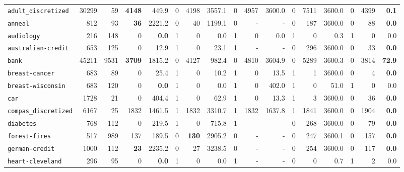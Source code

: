 \begin{tabular}{lccrrrrrrrrrrrrrr}
\texttt{adult\_discretized} & \multicolumn{1}{r}{30299} & \multicolumn{1}{r}{59}  & \textbf{4148} & 449.9 & 0 & 4198 & 3557.1 & 0 & 4957 & 3600.0 & 0 & 7511 & 3600.0 & 0 & 4399 & \textbf{0.1}\\
\texttt{anneal} & \multicolumn{1}{r}{812} & \multicolumn{1}{r}{93}  & \textbf{36} & 2221.2 & 0 & 40 & 1199.1 & 0 & - & - & 0 & 187 & 3600.0 & 0 & 88 & \textbf{0.0}\\
\texttt{audiology} & \multicolumn{1}{r}{216} & \multicolumn{1}{r}{148}  & 0 & \textbf{0.0} & 1 & 0 & 0.0 & 1 & 0 & 0.0 & 1 & 0 & 0.3 & 1 & 0 & 0.0\\
\texttt{australian-credit} & \multicolumn{1}{r}{653} & \multicolumn{1}{r}{125}  & 0 & 12.9 & 1 & 0 & 23.1 & 1 & - & - & 0 & 296 & 3600.0 & 0 & 33 & \textbf{0.0}\\
\texttt{bank} & \multicolumn{1}{r}{45211} & \multicolumn{1}{r}{9531}  & \textbf{3709} & 1815.2 & 0 & 4127 & 982.4 & 0 & 4810 & 3604.9 & 0 & 5289 & 3600.3 & 0 & 3814 & \textbf{72.9}\\
\texttt{breast-cancer} & \multicolumn{1}{r}{683} & \multicolumn{1}{r}{89}  & 0 & 25.4 & 1 & 0 & 10.2 & 1 & 0 & 13.5 & 1 & 1 & 3600.0 & 0 & 4 & \textbf{0.0}\\
\texttt{breast-wisconsin} & \multicolumn{1}{r}{683} & \multicolumn{1}{r}{120}  & 0 & \textbf{0.0} & 1 & 0 & 0.0 & 1 & 0 & 402.0 & 1 & 0 & 51.0 & 1 & 0 & 0.0\\
\texttt{car} & \multicolumn{1}{r}{1728} & \multicolumn{1}{r}{21}  & 0 & 404.4 & 1 & 0 & 62.9 & 1 & 0 & 13.3 & 1 & 3 & 3600.0 & 0 & 36 & \textbf{0.0}\\
\texttt{compas\_discretized} & \multicolumn{1}{r}{6167} & \multicolumn{1}{r}{25}  & 1832 & 1461.5 & 1 & 1832 & 3310.7 & 1 & 1832 & 1637.8 & 1 & 1841 & 3600.0 & 0 & 1904 & \textbf{0.0}\\
\texttt{diabetes} & \multicolumn{1}{r}{768} & \multicolumn{1}{r}{112}  & 0 & 219.5 & 1 & 0 & 715.8 & 1 & - & - & 0 & 268 & 3600.0 & 0 & 79 & \textbf{0.0}\\
\texttt{forest-fires} & \multicolumn{1}{r}{517} & \multicolumn{1}{r}{989}  & 137 & 189.5 & 0 & \textbf{130} & 2905.2 & 0 & - & - & 0 & 247 & 3600.1 & 0 & 157 & \textbf{0.0}\\
\texttt{german-credit} & \multicolumn{1}{r}{1000} & \multicolumn{1}{r}{112}  & \textbf{23} & 2235.2 & 0 & 27 & 3238.5 & 0 & - & - & 0 & 254 & 3600.0 & 0 & 117 & \textbf{0.0}\\
\texttt{heart-cleveland} & \multicolumn{1}{r}{296} & \multicolumn{1}{r}{95}  & 0 & \textbf{0.0} & 1 & 0 & 0.0 & 1 & - & - & 0 & 0 & 0.7 & 1 & 2 & 0.0\\

\end{tabular}
